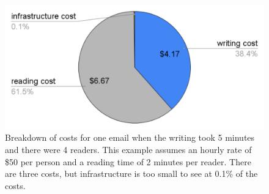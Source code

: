 \begin{figure}
    \centering %
    \iftoggle{narrowpage}{\newcommand\imgwidth{1.1}}{\newcommand\imgwidth{0.7}}
    \includegraphics[width=\imgwidth\textwidth]{images/email_costs_5minutes_4people.pdf}
    \caption{Breakdown of costs for one email when the writing took 5 minutes and there were 4 readers. This example assumes an hourly rate of \$50 per person and a reading time of 2 minutes per reader. There are three costs, but infrastructure is too small to see at 0.1\% of the costs.}
    \label{fig:email_pie_chart}
\end{figure}


